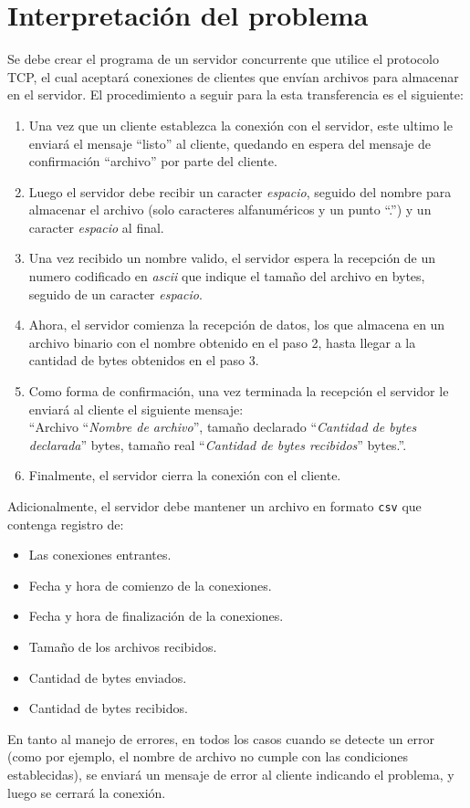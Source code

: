 \section{Interpretación del problema}

Se debe crear el programa de un servidor concurrente que utilice el protocolo TCP, el cual aceptará conexiones de clientes que envían archivos para almacenar en el servidor. El procedimiento a seguir para la esta transferencia es el siguiente:

\begin{enumerate}
    \item Una vez que un cliente establezca la conexión con el servidor, este ultimo le enviará el mensaje ``listo'' al cliente, quedando en espera del mensaje de confirmación ``archivo'' por parte del cliente.
    \item Luego el servidor debe recibir un caracter \textit{espacio}, seguido del nombre para almacenar el archivo (solo caracteres alfanuméricos y un punto ``.'') y un caracter \textit{espacio} al final.
    \item Una vez recibido un nombre valido, el servidor espera la recepción de un numero codificado en \textit{ascii} que indique el tamaño del archivo en bytes, seguido de un caracter \textit{espacio}.
    \item Ahora, el servidor comienza la recepción de datos, los que almacena en un archivo binario con el nombre obtenido en el paso 2, hasta llegar a la cantidad de bytes obtenidos en el paso 3.
    \item Como forma de confirmación, una vez terminada la recepción el servidor le enviará al cliente el siguiente mensaje:\\
     ``Archivo \enquote{\textit{Nombre de archivo}}, tamaño declarado \enquote{\textit{Cantidad de bytes declarada}} bytes, tamaño real \enquote{\textit{Cantidad de bytes recibidos}} bytes.''.
    \item Finalmente, el servidor cierra la conexión con el cliente.\\ 
\end{enumerate}

Adicionalmente, el servidor debe mantener un archivo en formato \texttt{csv} que contenga registro de:

\begin{itemize}
    \item Las conexiones entrantes.
    \item Fecha y hora de comienzo de la conexiones.
    \item Fecha y hora de finalización de la conexiones.
    \item Tamaño de los archivos recibidos.
    \item Cantidad de bytes enviados.
    \item Cantidad de bytes recibidos.\\
\end{itemize}

En tanto al manejo de errores, en todos los casos cuando se detecte un error (como por ejemplo, el nombre de archivo no cumple con las condiciones establecidas), se enviará un mensaje de error al cliente indicando el problema, y luego se cerrará la conexión.